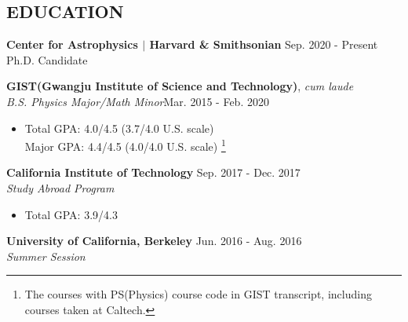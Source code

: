 \documentclass[margin, 10pt]{res} %
\begin{document}
\begin{resume}

 
\section{EDUCATION}  
{\bf Center for Astrophysics $\vert$ Harvard \& Smithsonian} \hfill Sep. 2020 - Present\\
Ph.D. Candidate

{\bf GIST(Gwangju Institute of Science and Technology)}, {\sl cum laude} \\
{\sl B.S. Physics Major/Math Minor}\hfill Mar. 2015 - Feb. 2020
\begin{itemize}
\small\item[] Total GPA: 4.0/4.5 (3.7/4.0 U.S. scale)\\
Major GPA: 4.4/4.5 (4.0/4.0 U.S. scale) \footnote{The courses with PS(Physics) course code in GIST transcript, including courses taken at Caltech.}
\end{itemize}

{\bf California Institute of Technology}  \hfill Sep. 2017 - Dec. 2017 \\
{\sl Study Abroad Program}
\begin{itemize}
\small\item[] Total GPA: 3.9/4.3
\begin{comment}
Ph127a Statistical Mechanics,\\
Ph77a Advanced Physics Laboratory,\\
ACM116 Introduction to Probability Models,\\
Ay20 Basic Astronomy and the Galaxy,\\
Ph103 Atomic and Molecular Physics(audit), Ph125a Quantum Mechanics(audit)
\end{comment}
\end{itemize}

{\bf University of California, Berkeley}  \hfill Jun. 2016 - Aug. 2016 \\
{\sl Summer Session}
\begin{comment}
\begin{itemize}
\small\item[] Chemical Structure and Reactivity\\
The Beauty and Joy of Computing
\end{itemize}
\end{comment}



\end{resume}
\end{document}
